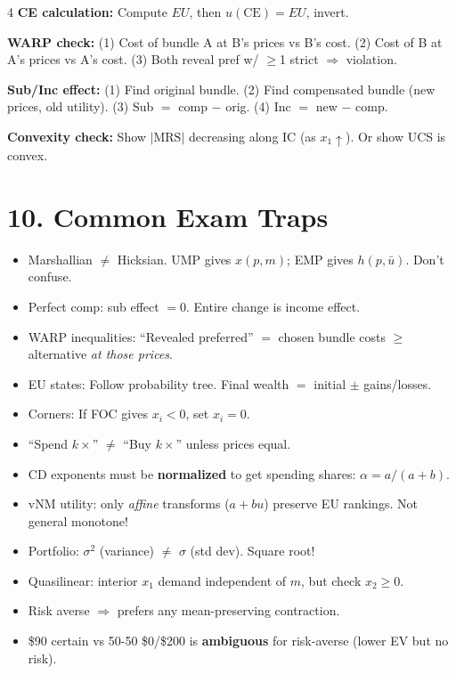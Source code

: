 \documentclass[8pt,landscape]{extarticle}
\newcommand{\HI}[1]{\colorbox{yellow!30}{#1}}
\begin{document}
\begin{multicols}{4}
\textbf{CE calculation:} Compute $EU$, then $u(\text{CE})=EU$, invert.

\textbf{WARP check:} (1) Cost of bundle A at B's prices vs B's cost. (2) Cost of B at A's prices vs A's cost. (3) Both reveal pref w/ $\geq$1 strict $\Rightarrow$ violation.

\textbf{Sub/Inc effect:} (1) Find original bundle. (2) Find compensated bundle (new prices, old utility). (3) Sub $=$ comp $-$ orig. (4) Inc $=$ new $-$ comp.

\textbf{Convexity check:} Show $|\text{MRS}|$ decreasing along IC (as $x_1\uparrow$). Or show UCS is convex.

\section{10. Common Exam Traps}

\begin{itemize}[leftmargin=6pt]
\item \HI{Marshallian $\neq$ Hicksian.} UMP gives $x(p,m)$; EMP gives $h(p,\bar{u})$. Don't confuse.
\item \HI{Perfect comp: sub effect $=0$.} Entire change is income effect.
\item \HI{WARP inequalities:} ``Revealed preferred'' $=$ chosen bundle costs $\geq$ alternative \emph{at those prices}.
\item \HI{EU states:} Follow probability tree. Final wealth $=$ initial $\pm$ gains/losses.
\item \HI{Corners:} If FOC gives $x_i<0$, set $x_i=0$.
\item ``Spend $k\times$'' $\neq$ ``Buy $k\times$'' unless prices equal.
\item CD exponents must be \textbf{normalized} to get spending shares: $\alpha = a/(a+b)$.
\item vNM utility: only \emph{affine} transforms ($a+bu$) preserve EU rankings. Not general monotone!
\item Portfolio: $\sigma^2$ (variance) $\neq$ $\sigma$ (std dev). Square root!
\item Quasilinear: interior $x_1$ demand independent of $m$, but check $x_2\geq 0$.
\item Risk averse $\Rightarrow$ prefers any mean-preserving contraction.
\item \$90 certain vs 50-50 \$0/\$200 is \textbf{ambiguous} for risk-averse (lower EV but no risk).
\end{itemize}

\end{multicols}
\end{document}
